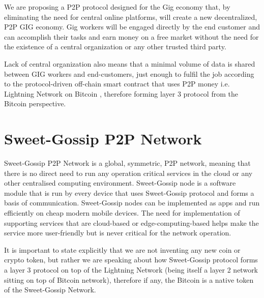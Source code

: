 \documentclass{article}
\begin{document}
We are proposing a P2P protocol designed for the Gig economy that, by eliminating the need for central online platforms, will create a new decentralized, P2P GIG economy. Gig workers will be engaged directly by the end customer and can accomplish their tasks and earn money on a free market without the need for the existence of a central organization or any other trusted third party.

Lack of central organization also means that a minimal volume of data is shared between GIG workers and end-customers, just enough to fulfil the job according to the protocol-driven off-chain smart contract that uses P2P money i.e. Lightning Network \cite{poon2016bitcoin} on Bitcoin \cite{nakamoto2009bitcoin}, therefore forming layer 3 protocol from the Bitcoin perspective.

\section{Sweet-Gossip P2P Network}
Sweet-Gossip P2P Network is a global, symmetric, P2P network, meaning that there is no direct need to run any operation critical services in the cloud or any other centralised computing environment. Sweet-Gossip node is a software module that is run by every device that uses Sweet-Gossip protocol and forms a basis of communication. Sweet-Gossip nodes can be implemented as apps and run efficiently on cheap modern mobile devices. The need for implementation of supporting services that are cloud-based or edge-computing-based helps make the service more user-friendly but is never critical for the network operation.

It is important to state explicitly that we are not inventing any new coin or crypto token, but rather we are speaking about how Sweet-Gossip protocol forms a layer 3 protocol on top of the Lightning Network (being itself a layer 2 network sitting on top of Bitcoin network), therefore if any, the Bitcoin is a native token of the Sweet-Gossip Network.
\end{document}
